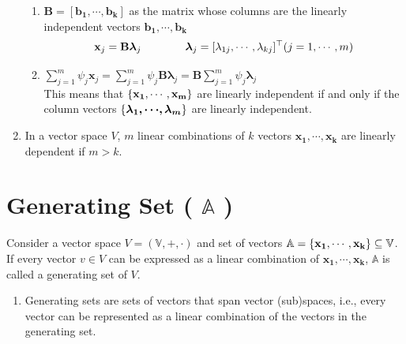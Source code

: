 \begin{enumerate}[itemsep=0.2cm]
\begin{enumerate}
        \item $\mathbf{B} = [\mathbf{b_1, \cdots, b_k}]$ as the matrix whose columns are the linearly independent vectors $\mathbf{b_1, \cdots, b_k}$
        \[
            \mathbf{x}_j = \mathbf{B{\bm{\lambda}}}_j \quad\quad\quad\quad \bm{\lambda}_j = [\lambda_{1j}, \cdots, \lambda_{kj}]^\top
            \hfill (j=1, \cdots,m)
        \]

        \item \( \displaystyle \sum_{j=1}^{m} \psi_j \mathbf{x}_j = \sum_{j=1}^{m} \psi_j \mathbf{B}\bm{\lambda}_j = \mathbf{B}\sum_{j=1}^{m} \psi_j \bm{\lambda}_j \)\\
        This means that $\left\{\mathbf{x_1, \cdots, x_m}\right\}$ are linearly independent if and only if the column vectors $\left\{\bm{\lambda_1, \cdots, \lambda_m}\right\}$ are linearly independent.

    \end{enumerate}

    \item In a vector space $V$, $m$ linear combinations of $k$ vectors $\mathbf{x_1, \cdots, x_k}$ are linearly dependent if $m > k$.
\end{enumerate}







\section{Generating Set ( $\mathbb{A}$ ) \cite{mfml-1}}\label{Generating Set}
Consider a vector space $V = (\mathbb{V}, +, \cdot)$ and set of vectors $\mathbb{A} = \mathbf{\left\{x_1, \cdots , x_k\right\}} \subseteq \mathbb{V}$. If every vector $v \in V$ can be expressed as a linear combination of $\mathbf{x_1, \cdots , x_k}$, $\mathbb{A}$ is called a generating set of $V$.

\begin{enumerate}
    \item Generating sets are sets of vectors that span vector (sub)spaces, i.e., every vector can be represented as a linear combination of the vectors in the generating set.
\end{enumerate}













